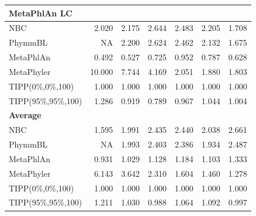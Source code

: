 \begin{table}[hptb]
\begin{center}
{\begin{tabular}{|l|r|r|r|r|r|r|}
\hline
{\bf MetaPhlAn LC}&&&&&&\\
\hline
NBC&2.020&2.175&2.644&2.483&2.205&1.708\\
PhymmBL&NA&2.200&2.624&2.462&2.132&1.675\\
MetaPhlAn&0.492&0.527&0.725&0.952&0.787&0.628\\
MetaPhyler&10.000&7.744&4.169&2.051&1.880&1.803\\
TIPP(0\%,0\%,100)&1.000&1.000&1.000&1.000&1.000&1.000\\
TIPP(95\%,95\%,100)&1.286&0.919&0.789&0.967&1.044&1.004\\
\hline
{\bf Average}&&&&&&\\
\hline
NBC&1.595&1.991&2.435&2.440&2.038&2.661\\
PhymmBL&NA&1.993&2.403&2.386&1.934&2.487\\
MetaPhlAn&0.931&1.029&1.128&1.184&1.103&1.333\\
MetaPhyler&6.143&3.642&2.310&1.604&1.460&1.278\\
TIPP(0\%,0\%,100)&1.000&1.000&1.000&1.000&1.000&1.000\\
TIPP(95\%,95\%,100)&1.211&1.030&0.988&1.064&1.092&0.997\\
\hline
\end{tabular}}
\end{center}
\end{table}


